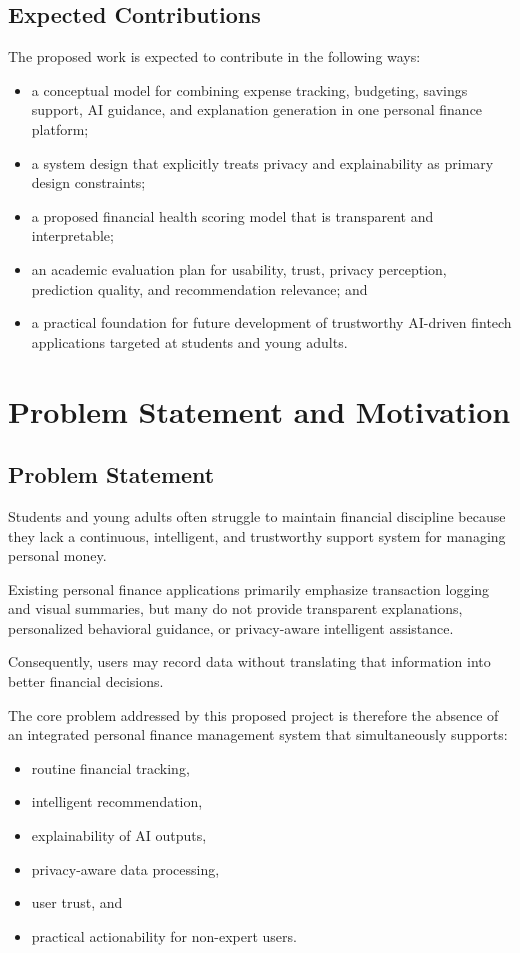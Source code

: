 \documentclass[12pt,a4paper]{report}
\begin{document}
\section{Expected Contributions}
The proposed work is expected to contribute in the following ways:
\begin{itemize}[leftmargin=2em]
\item a conceptual model for combining expense tracking,
budgeting,
savings support,
AI guidance,
and explanation generation in one personal finance platform;
\item a system design that explicitly treats privacy and explainability as primary design constraints;
\item a proposed financial health scoring model that is transparent and interpretable;
\item an academic evaluation plan for usability,
trust,
privacy perception,
prediction quality,
and recommendation relevance; and
\item a practical foundation for future development of trustworthy AI-driven fintech applications targeted at students and young adults.
\end{itemize}

\chapter{Problem Statement and Motivation}

\section{Problem Statement}
Students and young adults often struggle to maintain financial discipline because they lack a continuous,
intelligent,
and trustworthy support system for managing personal money.

Existing personal finance applications primarily emphasize transaction logging and visual summaries,
but many do not provide transparent explanations,
personalized behavioral guidance,
or privacy-aware intelligent assistance.

Consequently,
users may record data without translating that information into better financial decisions.

The core problem addressed by this proposed project is therefore the absence of an integrated personal finance management system that simultaneously supports:
\begin{itemize}[leftmargin=2em]
\item routine financial tracking,
\item intelligent recommendation,
\item explainability of AI outputs,
\item privacy-aware data processing,
\item user trust,
and
\item practical actionability for non-expert users.
\end{itemize}
\end{document}
